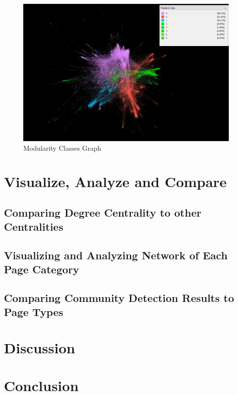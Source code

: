 \documentclass[11pt,twocolumn]{article}
\begin{document}
\begin{figure}[hbt!]
\includegraphics[scale=0.3]{modularity_community.JPG} 
\caption{Modularity Classes Graph}
\end{figure}



\section{Visualize, Analyze and Compare}

\subsection{Comparing Degree Centrality to other Centralities}

\subsection{Visualizing and Analyzing Network of Each Page Category}

\subsection{Comparing Community Detection Results to Page Types}

\section{Discussion}


\section{Conclusion}
\end{document}
